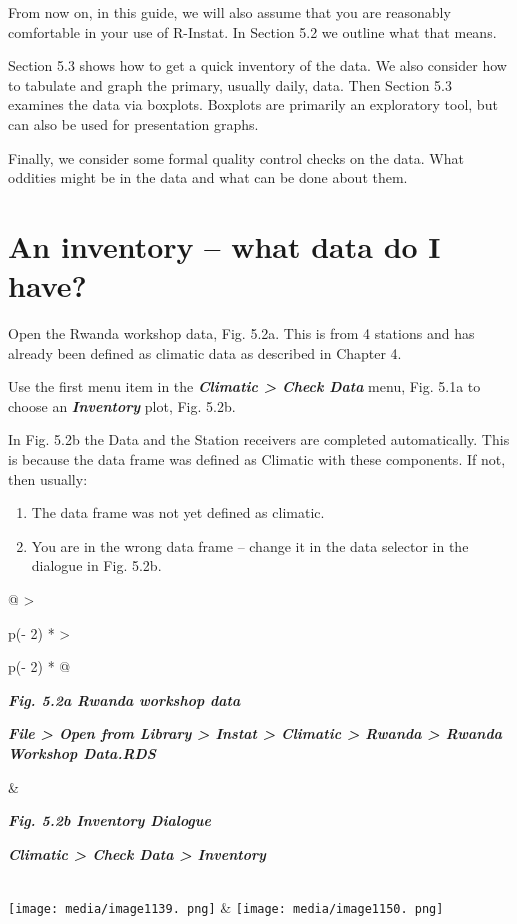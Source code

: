 \documentclass[
  letterpaper,
  DIV=11,
  numbers=noendperiod]{scrreprt}
\begin{document}
From now on, in this guide, we will also assume that you are reasonably
comfortable in your use of R-Instat. In Section 5.2 we outline what that
means.

Section 5.3 shows how to get a quick inventory of the data. We also
consider how to tabulate and graph the primary, usually daily, data.
Then Section 5.3 examines the data via boxplots. Boxplots are primarily
an exploratory tool, but can also be used for presentation graphs.

Finally, we consider some formal quality control checks on the data.
What oddities might be in the data and what can be done about them.

\section{An inventory -- what data do I
have?}\label{an-inventory-what-data-do-i-have}

Open the Rwanda workshop data, Fig. 5.2a. This is from 4 stations and
has already been defined as climatic data as described in Chapter 4.

Use the first menu item in the \textbf{\emph{Climatic \textgreater{}
Check Data}} menu, Fig. 5.1a to choose an \textbf{\emph{Inventory}}
plot, Fig. 5.2b.

In Fig. 5.2b the Data and the Station receivers are completed
automatically. This is because the data frame was defined as Climatic
with these components. If not, then usually:

\begin{enumerate}
\def\labelenumi{\alph{enumi}.}
\item
  The data frame was not yet defined as climatic.
\item
  You are in the wrong data frame -- change it in the data selector in
  the dialogue in Fig. 5.2b.
\end{enumerate}

\begin{longtable}[]{@{}
  >{\raggedright\arraybackslash}p{(\columnwidth - 2\tabcolsep) * }
  >{\raggedright\arraybackslash}p{(\columnwidth - 2\tabcolsep) * }@{}}
\toprule\noalign{}
\begin{minipage}[b]{\linewidth}\raggedright
\textbf{\emph{Fig. 5.2a Rwanda workshop data}}

\textbf{\emph{File \textgreater{} Open from Library \textgreater{}
Instat \textgreater{} Climatic \textgreater{} Rwanda \textgreater{}
Rwanda Workshop Data.RDS}}
\end{minipage} & \begin{minipage}[b]{\linewidth}\raggedright
\textbf{\emph{Fig. 5.2b Inventory Dialogue}}

\textbf{\emph{Climatic \textgreater{} Check Data \textgreater{}
Inventory}}
\end{minipage} \\
\midrule\noalign{}
\endhead
\bottomrule\noalign{}
\endlastfoot
\texttt{[image: media/image1139. png]}
&
\texttt{[image: media/image1150. png]} \\
\end{longtable}
\end{document}
